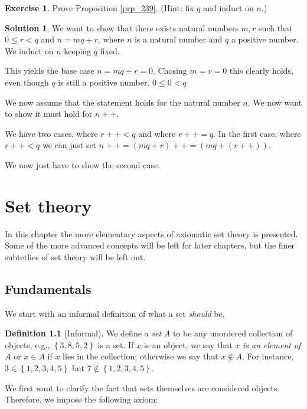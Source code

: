 \documentclass[a4paper, twocolumn]{report}
\newcounter{dummy} \numberwithin{dummy}{section}
\newcounter{exercise} \numberwithin{exercise}{section}
\theoremstyle{definition}
\newtheorem{defn}[dummy]{Definition}
\newtheorem{exc}[exercise]{Exercise}
\theoremstyle{solution}
\newtheorem*{sltn}{Solution}
\newcommand{\dplus}{{+}{+}} %
\begin{document}
\begin{exc}
  Prove Proposition \ref{prp_239}. (Hint: fix $q$ and induct on $n$.)
\end{exc}
\begin{sltn}
  We want to show that there exists natural numbers $m, r$ such that $0 \leq r
  < q$ and $n = mq + r$, where $n$ is a natural number and $q$ a positive
  number.  We induct on $n$ keeping $q$ fixed.

  This yields the base case $n = mq + r = 0$. Chosing $m = r = 0$ this clearly
  holds, even though $q$ is still a positive number. $0 \leq 0 < q$

  We now assume that the statement holds for the natural number $n$. We now
  want to show it must hold for $n\dplus$.

  We have two cases, where $r\dplus < q$ and where $r\dplus = q$.  In the first
  case, where $r\dplus < q$ we can just set $n\dplus = (mq + r)\dplus = (mq +
  (r\dplus))$.

  We now just have to show the second case.
\end{sltn}

\chapter{Set theory}

In this chapter the more elementary aspects of axiomatic set theory is
presented. Some of the more advanced concepts will be left for later chapters,
but the finer subtetlies of set theory will be left out. 

\section{Fundamentals}

We start with an informal definition of what a set \textit{should} be.

\begin{defn}[Informal]
  \label{defn_311}
  We define a \textit{set} $A$ to be any unordered collection of objects, e.g.,
  $\left\{ 3, 8, 5, 2 \right\}$ is a set. If $x$ is an object, we say that $x$
  \textit{is an element of} $A$ or $x \in A$ if $x$ lies in the collection;
  otherwise we say that $x \notin A$. For instance, $3 \in \left\{ 1, 2, 3, 4,
  5 \right\}$ but $7 \notin \left\{ 1, 2, 3, 4, 5 \right\}$.
\end{defn}

We first want to clarify the fact that sets themselves are considered objects.
Therefore, we impose the following axiom:
\end{document}
